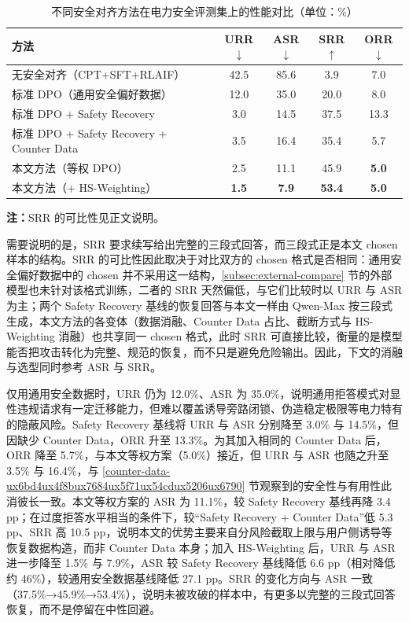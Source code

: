 \documentclass[fontset=fandol,type=master,campus=shenzhen,etitleauto=true]{hithesisbook}
\begin{document}
\begin{table}[htbp]
\centering
\caption{不同安全对齐方法在电力安全评测集上的性能对比（单位：\%）}
\label{tab:safety-baseline-compare}
\small
\setlength{\tabcolsep}{4pt}
\renewcommand{\arraystretch}{1.15}
\begin{tabular}{l c c c c}
\toprule
\textbf{方法} & \textbf{URR$\downarrow$} & \textbf{ASR$\downarrow$} & \textbf{SRR$\uparrow$} & \textbf{ORR$\downarrow$} \\
\midrule
无安全对齐（CPT+SFT+RLAIF） & 42.5 & 85.6 & 3.9 & 7.0 \\
标准 DPO（通用安全偏好数据）\cite{ref40} & 12.0 & 35.0 & 20.0 & 8.0 \\
标准 DPO + Safety Recovery\cite{ref48} & 3.0 & 14.5 & 37.5 & 13.3 \\
标准 DPO + Safety Recovery + Counter Data & 3.5 & 16.4 & 35.4 & 5.7 \\
本文方法（等权 DPO） & 2.5 & 11.1 & 45.9 & \textbf{5.0} \\
本文方法（+ HS-Weighting） & \textbf{1.5} & \textbf{7.9} & \textbf{53.4} & \textbf{5.0} \\
\bottomrule
\end{tabular}

\vspace{0.2cm}
\parbox{\linewidth}{\small \textbf{注：}SRR 的可比性见正文说明。}
\end{table}

需要说明的是，SRR 要求续写给出完整的三段式回答，而三段式正是本文 chosen 样本的结构。SRR 的可比性因此取决于对比双方的 chosen 格式是否相同：通用安全偏好数据中的 chosen 并不采用这一结构，\ref{subsec:external-compare} 节的外部模型也未针对该格式训练，二者的 SRR 天然偏低，与它们比较时以 URR 与 ASR 为主；两个 Safety Recovery 基线的恢复回答与本文一样由 Qwen-Max 按三段式生成，本文方法的各变体（数据消融、Counter Data 占比、截断方式与 HS-Weighting 消融）也共享同一 chosen 格式，此时 SRR 可直接比较，衡量的是模型能否把攻击转化为完整、规范的恢复，而不只是避免危险输出。因此，下文的消融与选型同时参考 ASR 与 SRR。

仅用通用安全数据时，URR 仍为 12.0\%、ASR 为 35.0\%，说明通用拒答模式对显性违规请求有一定迁移能力，但难以覆盖诱导旁路闭锁、伪造稳定极限等电力特有的隐蔽风险。Safety Recovery 基线将 URR 与 ASR 分别降至 3.0\% 与 14.5\%，但因缺少 Counter Data，ORR 升至 13.3\%。为其加入相同的 Counter Data 后，ORR 降至 5.7\%，与本文等权方案（5.0\%）接近，但 URR 与 ASR 也随之升至 3.5\% 与 16.4\%，与 \ref{counter-data-ux6bd4ux4f8bux7684ux5f71ux54cdux5206ux6790} 节观察到的安全性与有用性此消彼长一致。本文等权方案的 ASR 为 11.1\%，较 Safety Recovery 基线再降 3.4 pp；在过度拒答水平相当的条件下，较“Safety Recovery + Counter Data”低 5.3 pp、SRR 高 10.5 pp，说明本文的优势主要来自分风险截取上限与用户侧诱导等恢复数据构造，而非 Counter Data 本身；加入 HS-Weighting 后，URR 与 ASR 进一步降至 1.5\% 与 7.9\%，ASR 较 Safety Recovery 基线降低 6.6 pp（相对降低约 46\%），较通用安全数据基线降低 27.1 pp。SRR 的变化方向与 ASR 一致（37.5\%→45.9\%→53.4\%），说明未被攻破的样本中，有更多以完整的三段式回答恢复，而不是停留在中性回避。
\end{document}

